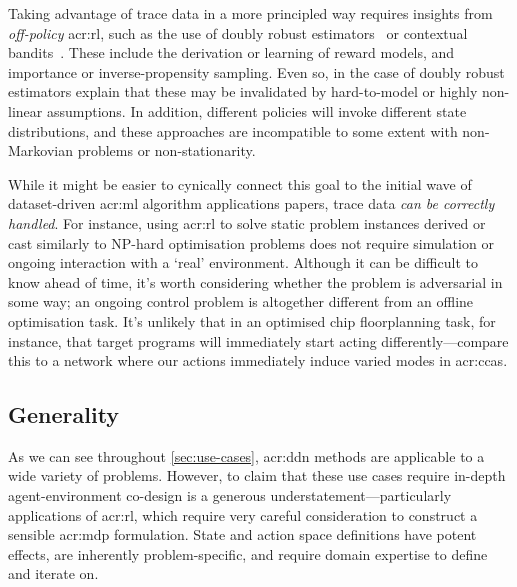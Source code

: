 Taking advantage of trace data in a more principled way requires insights from \emph{off-policy} \gls{acr:rl}, such as the use of doubly robust estimators~\parencite{DBLP:conf/hotnets/BartulovicJBSS17} or contextual bandits~\parencite{DBLP:conf/hotnets/LecuyerLNSSS17}.
These include the derivation or learning of reward models, and importance or inverse-propensity sampling.
Even so, in the case of doubly robust estimators \citeauthor{DBLP:conf/hotnets/BartulovicJBSS17} explain that these may be invalidated by hard-to-model or highly non-linear assumptions.
In addition, different policies will invoke different state distributions, and these approaches are incompatible to some extent with non-Markovian problems or non-stationarity.

While it might be easier to cynically connect this goal to the initial wave of dataset-driven \gls{acr:ml} algorithm applications papers, trace data \emph{can be correctly handled}.
For instance, using \gls{acr:rl} to solve static problem instances derived or cast similarly to \textsf{NP}-hard optimisation problems does not require simulation or ongoing interaction with a `real' environment.
Although it can be difficult to know ahead of time, it's worth considering whether the problem is adversarial in some way; an ongoing control problem is altogether different from an offline optimisation task.
It's unlikely that in an optimised chip floorplanning task, for instance, that target programs will immediately start acting differently---compare this to a network where our actions immediately induce varied modes in \glspl{acr:cca}.

\subsection{Generality}
As we can see throughout \cref{sec:use-cases}, \gls{acr:ddn} methods are applicable to a wide variety of problems.
However, to claim that these use cases require in-depth agent-environment co-design is a generous understatement---particularly applications of \gls{acr:rl}, which require very careful consideration to construct a sensible \gls{acr:mdp} formulation.
State and action space definitions have potent effects, are inherently problem-specific, and require domain expertise to define and iterate on.

